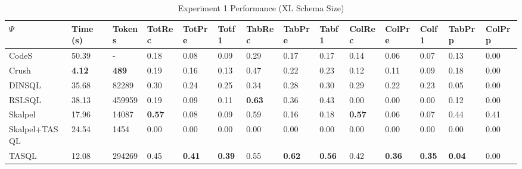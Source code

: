 \begin{table*}
\caption{Experiment 1 Performance (XL Schema Size)}
\label{tab:exp1-xl-schema}
\begin{tabular}{llllllllllllll}
\toprule
$\Psi$ & Time (s) & Tokens & TotRec & TotPre & Totf1 & TabRec & TabPre & Tabf1 & ColRec & ColPre & Colf1 & TabPrp & ColPrp \\
\midrule
CodeS & 50.39 & - & 0.18 & 0.08 & 0.09 & 0.29 & 0.17 & 0.17 & 0.14 & 0.06 & 0.07 & 0.13 & 0.00 \\
Crush & \textbf{4.12} & \textbf{489} & 0.19 & 0.16 & 0.13 & 0.47 & 0.22 & 0.23 & 0.12 & 0.11 & 0.09 & 0.18 & 0.00 \\
DINSQL & 35.68 & 82289 & 0.30 & 0.24 & 0.25 & 0.34 & 0.28 & 0.30 & 0.29 & 0.22 & 0.23 & 0.05 & 0.00 \\
RSLSQL & 38.13 & 459959 & 0.19 & 0.09 & 0.11 & \textbf{0.63} & 0.36 & 0.43 & 0.00 & 0.00 & 0.00 & 0.12 & 0.00 \\
Skalpel & 17.96 & 14087 & \textbf{0.57} & 0.08 & 0.09 & 0.59 & 0.16 & 0.18 & \textbf{0.57} & 0.06 & 0.07 & 0.44 & 0.41 \\
Skalpel+TASQL & 24.54 & 1454 & 0.00 & 0.00 & 0.00 & 0.00 & 0.00 & 0.00 & 0.00 & 0.00 & 0.00 & 0.00 & 0.00 \\
TASQL & 12.08 & 294269 & 0.45 & \textbf{0.41} & \textbf{0.39} & 0.55 & \textbf{0.62} & \textbf{0.56} & 0.42 & \textbf{0.36} & \textbf{0.35} & \textbf{0.04} & 0.00 \\
\bottomrule
\end{tabular}
\end{table*}
